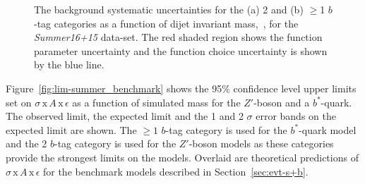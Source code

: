 \begin{figure}[!ht]
  \begin{center}
    \captionsetup[subfigure]{aboveskip=0pt,justification=centering}
  \end{center}
  \vspace{-1mm}
  \caption{The background systematic uncertainties for the (a) 2 and (b) $\geq$1 $b$-tag categories
    as a function of dijet invariant mass,~\mjj, for the \textit{Summer16+15} data-set.
    The red shaded region shows the function parameter uncertainty and the
    function choice uncertainty is shown by the blue line. }
  \label{fig:lim-summer_systBkg}
\end{figure}

Figure~\ref{fig:lim-summer_benchmark} shows the
95\% confidence level upper limits set on $\sigma\,\text{x}\,\mathit{A}\,\text{x}\,\epsilon$
as a function of simulated mass
for the $Z'$-boson and a $b^*$-quark.
The observed limit, the expected limit and the 1 and 2 $\sigma$ error bands on the expected limit are shown.
The $\geq1$ $b$-tag category is used for the $b^*$-quark model
and the 2 $b$-tag category is used for the $Z'$-boson models
as these categories provide the strongest limits on the models.
Overlaid are theoretical predictions of
$\sigma\,\text{x}\,\mathit{A}\,\text{x}\,\epsilon$ for the benchmark models described in Section~\ref{sec:evt-s+b}.

